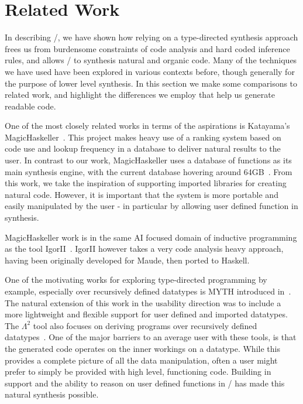 \section{Related Work}
\label{sec:related}

In describing \ourTool/, we have shown how relying on a type-directed synthesis approach frees us from burdensome constraints of code analysis and hard coded inference rules, and allows \ourTool/ to synthesis natural and organic code. Many of the techniques we have used have been explored in various contexts before, though generally for the purpose of lower level synthesis. In this section we make some comparisons to related work, and highlight the differences we employ that help us generate readable code.

One of the most closely related works in terms of the aspirations is Katayama's MagicHaskeller~\cite{DBLP:conf/aaip/Katayama09}. This project makes heavy use of a ranking system based on code use and lookup frequency in a database to deliver natural results to the user. In contrast to our work, MagicHaskeller uses a database of functions as its main synthesis engine, with the current database hovering around 
64GB~\cite{DBLP:conf/agi/Katayama15}. From this work, we take the inspiration of supporting imported libraries for creating natural code. However, it is important that the system is more portable and easily manipulated by the user - in particular by allowing user defined function in synthesis.

MagicHaskeller work is in the same AI focused domain of inductive programming as the tool IgorII~\cite{DBLP:conf/aaip/HofmannKS09}. IgorII however takes a very code analysis heavy approach, having been originally developed for Maude, then ported to Haskell.

One of the motivating works for exploring type-directed programming by example, especially over recursively defined datatypes is MYTH introduced in~\cite{Osera:2015}. The natural extension of this work in the usability direction was to include a more lightweight and flexible support for user defined and imported datatypes. The $\Lambda^2$ tool also focuses on deriving programs over recursively defined datatypes~\cite{Feser:2015}. One of the major barriers to an average user with these tools, is that the generated code operates on the inner workings on a datatype. While this provides a complete picture of all the data manipulation, often a user might prefer to simply be provided with high level, functioning code. Building in support and the ability to reason on user defined functions in \ourTool/ has made this natural synthesis possible.

